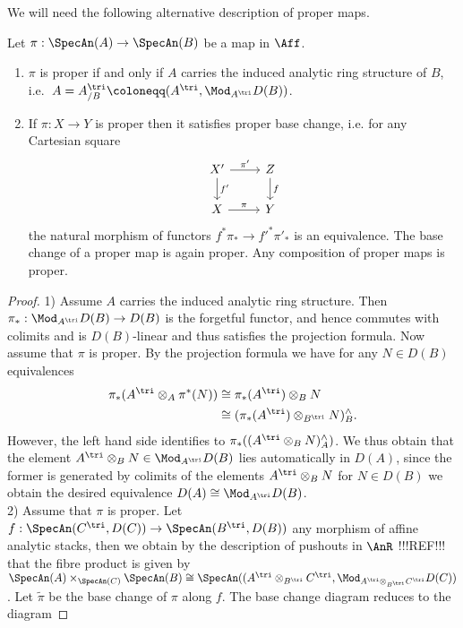  We will need the following alternative description of proper maps. 
\begin{lemma}\label{alternative char. of open and proper in aff}
Let $\pi: \SpecAn(A) \to \SpecAn(B)$ be a map in $\Aff$. 
\begin{enumerate}
    \item $\pi$ is proper if and only if $A$ carries the induced analytic ring structure of $B$, i.e.\  $A=A^{\tri}_{/B}\coloneqq (A^{\tri},\Mod_{A^{\tri}}D(B))$. 
    \item If $\pi : X \to Y$ is proper then it satisfies proper base change, i.e. for any  Cartesian square
    \[\begin{tikzcd}
	{X'} & Z \\
	X & Y
	\arrow["{\pi'}", from=1-1, to=1-2]
	\arrow["{f'}", from=1-1, to=2-1]
	\arrow["f", from=1-2, to=2-2]
	\arrow["\pi", from=2-1, to=2-2]
\end{tikzcd}\]
the natural morphism of functors $f^*\pi_* \to f'^*\pi'_*$ is an equivalence. The base change of a proper map is again proper. Any composition of proper maps is proper.
   
\end{enumerate}
\begin{proof}
1) Assume $A$ carries the induced analytic ring structure. Then $\pi_* : \Mod_{A^{\tri}}D(B) \to D(B)$ is the forgetful functor, and hence commutes with colimits and is $D(B)$-linear and thus satisfies the projection formula.  Now assume that $\pi$ is proper. By the projection formula we have for any $N \in D(B)$ equivalences 
\begin{align*}
\pi_*(A^{\tri}\otimes_A \pi^*(N)) &\cong \pi_*(A^{\tri})\otimes_B N \\
& \cong  (\pi_*(A^{\tri}) \otimes_{B^{\tri}}N)^{\wedge}_B.
\end{align*}
However, the left hand side identifies to $\pi_*( (A^{\tri} \otimes_B N)^{\wedge}_A)$. We thus obtain that the element $A^{\tri}\otimes_B N \in \Mod_{A^{\tri}}D(B) $ lies automatically in $D(A)$, since the former is generated by colimits of the elements $A^{\tri}\otimes_B N$ for $N\in D(B)$  we obtain the desired equivalence $D(A) \cong \Mod_{A^{\tri}}D(B)$. \\
2)  Assume  that $\pi$ is proper. Let $f: \SpecAn(C^{\tri},D(C))\to \SpecAn(B^{\tri},D(B))$ any morphism of affine analytic stacks, then we obtain by the description of pushouts in $\AnR$  !!!REF!!! that the fibre product is given by $\SpecAn(A)\times_{\SpecAn(C)}\SpecAn(B)\cong \SpecAn((A^{\tri}\otimes_{B^{\tri}}C^{\tri},\Mod_{A^{\tri}\otimes_{B^{\tri}}C^{\tri}}D(C))$. Let $\tilde{\pi}$ be the base change of $\pi$ along $f$. The base change diagram reduces to the diagram 


\end{proof}
\end{lemma}
